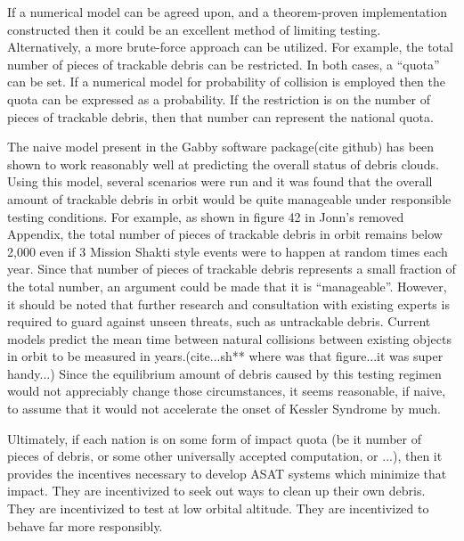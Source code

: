 If a numerical model can be agreed upon, and a theorem-proven implementation constructed then it could be an excellent method of limiting testing.  Alternatively, a more brute-force approach can be utilized.  For example, the total number of pieces of trackable debris can be restricted.  In both cases, a ``quota'' can be set.  If a numerical model for probability of collision is employed then the quota can be expressed as a probability.  If the restriction is on the number of pieces of trackable debris, then that number can represent the national quota.

The naive model present in the Gabby software package(cite github) has been shown to work reasonably well at predicting the overall status of debris clouds.  Using this model, several scenarios were run and it was found that the overall amount of trackable debris in orbit would be quite manageable under responsible testing conditions.  For example, as shown in figure 42 in Jonn's removed Appendix, the total number of pieces of trackable debris in orbit remains below 2,000 even if 3 Mission Shakti style events were to happen at random times each year.  Since that number of pieces of trackable debris represents a small fraction of the total number, an argument could be made that it is ``manageable''.  However, it should be noted that further research and consultation with existing experts is required to guard against unseen threats, such as untrackable debris.  Current models predict the mean time between natural collisions between existing objects in orbit to be measured in years.(cite...sh** where was that figure...it was super handy...)  Since the equilibrium amount of debris caused by this testing regimen would not appreciably change those circumstances, it seems reasonable, if naive, to assume that it would not accelerate the onset of Kessler Syndrome by much.

Ultimately, if each nation is on some form of impact quota (be it number of pieces of debris, or some other universally accepted computation, or ...), then it provides the incentives necessary to develop ASAT systems which minimize that impact.  They are incentivized to seek out ways to clean up their own debris.  They are incentivized to test at low orbital altitude.  They are incentivized to behave far more responsibly.

